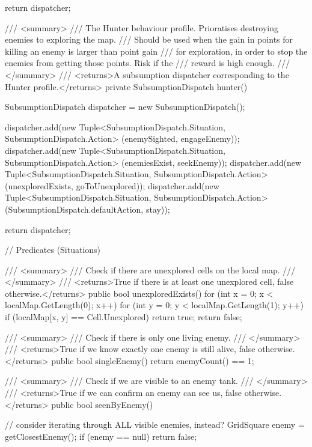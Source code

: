 \documentclass[11pt]{article}
\begin{document}
\begin{code}
{{{            return dispatcher;
        }

        /// <summary>
        /// The Hunter behaviour profile. Prioratises destroying enemies to exploring the map.
        /// Should be used when the gain in points for killing an enemy is larger than point gain
        /// for exploration, in order to stop the enemies from getting those points. Risk if the
        /// reward is high enough.
        /// </summary>
        /// <returns>A subsumption dispatcher corresponding to the Hunter profile.</returns>
        private SubsumptionDispatch hunter()
        {
            SubsumptionDispatch dispatcher = new SubsumptionDispatch();

            dispatcher.add(new Tuple<SubsumptionDispatch.Situation, SubsumptionDispatch.Action>
                (enemySighted, engageEnemy));
            dispatcher.add(new Tuple<SubsumptionDispatch.Situation, SubsumptionDispatch.Action>
                (enemiesExist, seekEnemy));
            dispatcher.add(new Tuple<SubsumptionDispatch.Situation, SubsumptionDispatch.Action>
                (unexploredExists, goToUnexplored));
            dispatcher.add(new Tuple<SubsumptionDispatch.Situation, SubsumptionDispatch.Action>
                (SubsumptionDispatch.defaultAction, stay));

            return dispatcher;
        }

        // Predicates (Situations)

        /// <summary>
        /// Check if there are unexplored cells on the local map.
        /// </summary>
        /// <returns>True if there is at least one unexplored cell, false otherwise.</returns>
        public bool unexploredExists()
        {
            for (int x = 0; x < localMap.GetLength(0); x++)
            {
                for (int y = 0; y < localMap.GetLength(1); y++)
                {
                    if (localMap[x, y] == Cell.Unexplored)
                    {
                        return true;
                    }
                }
            }
            return false;
        }

        /// <summary>
        /// Check if there is only one living enemy.
        /// </summary>
        /// <returns>True if we know exactly one enemy is still alive, false otherwise.</returns>
        public bool singleEnemy()
        {
            return enemyCount() == 1;
        }

        /// <summary>
        /// Check if we are visible to an enemy tank.
        /// </summary>
        /// <returns>True if we can confirm an enemy can see us, false otherwise.</returns>
        public bool seenByEnemy()
        {
            // consider iterating through ALL visible enemies, instead?
            GridSquare enemy = getClosestEnemy();
            if (enemy == null)
            {
                return false;
            }

}}}
\end{code}
\end{document}

